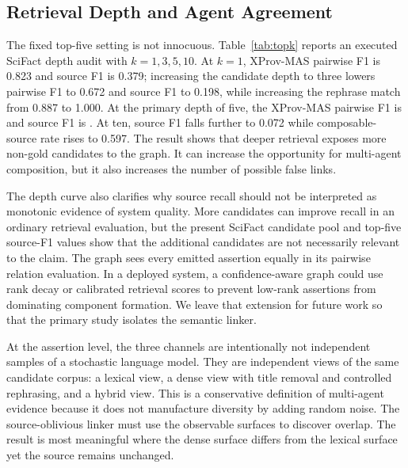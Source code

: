 \documentclass{ieeeaccess}
\begin{document}
\subsection{Retrieval Depth and Agent Agreement}
The fixed top-five setting is not innocuous. Table~\ref{tab:topk} reports an executed SciFact depth audit with $k=1,3,5,10$. At $k=1$, XProv-MAS pairwise F1 is 0.823 and source F1 is 0.379; increasing the candidate depth to three lowers pairwise F1 to 0.672 and source F1 to 0.198, while increasing the rephrase match from 0.887 to 1.000. At the primary depth of five, the XProv-MAS pairwise F1 is \SciFactXProvFOne and source F1 is \SciFactXProvSourceFOne. At ten, source F1 falls further to 0.072 while composable-source rate rises to 0.597. The result shows that deeper retrieval exposes more non-gold candidates to the graph. It can increase the opportunity for multi-agent composition, but it also increases the number of possible false links.

The depth curve also clarifies why source recall should not be interpreted as monotonic evidence of system quality. More candidates can improve recall in an ordinary retrieval evaluation, but the present SciFact candidate pool and top-five source-F1 values show that the additional candidates are not necessarily relevant to the claim. The graph sees every emitted assertion equally in its pairwise relation evaluation. In a deployed system, a confidence-aware graph could use rank decay or calibrated retrieval scores to prevent low-rank assertions from dominating component formation. We leave that extension for future work so that the primary study isolates the semantic linker.

\begin{table}[!ht]
\centering
\caption{SciFact executed top-$k$ sensitivity for XProv-MAS.}
\label{tab:topk}
\end{table}

At the assertion level, the three channels are intentionally not independent samples of a stochastic language model. They are independent views of the same candidate corpus: a lexical view, a dense view with title removal and controlled rephrasing, and a hybrid view. This is a conservative definition of multi-agent evidence because it does not manufacture diversity by adding random noise. The source-oblivious linker must use the observable surfaces to discover overlap. The result is most meaningful where the dense surface differs from the lexical surface yet the source remains unchanged.
\end{document}
